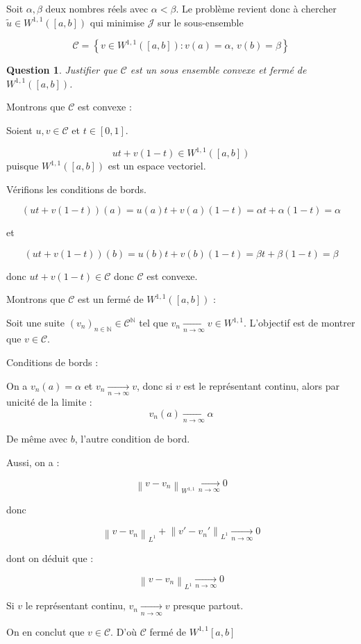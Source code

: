 \documentclass{article}
\newcommand{\Integer}{ \mathbb{N} }
\newcommand{\Set}[1]{ \left\{ #1 \right\} }
\newcommand{\Sobolev}[1]{ W^{1,1}\left( #1 \right) }
\newcommand{\Norm}[2]{ \left\| #1 \right\|_{#2} }
\newcommand{\TendsTo}[4]{#1 \xrightarrow[#2  \rightarrow #3]{} #4}
\newtheorem{question}{Question}[subsection]
\newenvironment{answer}
  {\color{blue}}
  {}
\newcommand{\QuestionAnswer}[2]{
    \begin{question}
        #1
    \end{question}
    \begin{answer}
        #2
    \end{answer}
}
\newcommand{\SetC}{\mathcal{C}}
\begin{document}
Soit $\alpha, \beta$ deux nombres réels avec $\alpha < \beta$. Le problème revient donc à chercher $\tilde{u} \in \Sobolev{[a, b]}$ qui minimise $ \mathcal{J} $ sur le sous-ensemble
    
$$\SetC = \Set{v \in \Sobolev{[a, b]} : v(a) = \alpha, \, v(b) = \beta }$$

\QuestionAnswer{
     Justifier que $\SetC$ est un sous ensemble convexe et fermé de  $\Sobolev{[a, b]}$.
}{
    Montrons que $\SetC$ est convexe :

    Soient $u, v \in \SetC$ et $t \in [0, 1]$.

    $$u t + v (1-t) \in \Sobolev{[a, b]}$$ puisque $\Sobolev{[a, b]}$ est un espace vectoriel.

    Vérifions les conditions de bords.

    $$(u t + v (1-t))(a) = u(a) t + v(a) (1-t) = \alpha t + \alpha (1-t) = \alpha$$

    et

    $$(u t + v (1-t))(b) = u(b) t + v(b) (1-t) = \beta t + \beta (1-t) = \beta$$

    donc $u t + v (1-t) \in \SetC$ donc $\SetC$ est convexe.
    \newline

    Montrons que $\SetC$ est un fermé de $\Sobolev{[a, b]}$ :

    Soit une suite $(v_n)_{n \in \Integer} \in \SetC^\Integer$ tel que $\TendsTo{v_n}{n}{\infty}{v \in W^{1,1}}$. L'objectif est de montrer que $v \in \SetC$.\newline

    Conditions de bords :\newline

    On a $v_n(a) = \alpha$ et $\TendsTo{v_n}{n}{\infty}{v}$, donc si $v$ est le représentant continu, alors par unicité de la limite :
    $$\TendsTo{v_n(a)}{n}{\infty}{\alpha}$$

    De même avec $b$, l'autre condition de bord.

    Aussi, on a :

    $$\TendsTo{ \Norm{v - v_n}{W^{1,1}} }{n}{\infty}{0}$$

    donc

    $$\TendsTo{ \Norm{v - v_n}{L^1} + \Norm{v' - v_n'}{L^1} }{n}{\infty}{0}$$

    dont on déduit que :

    $$\TendsTo{ \Norm{v - v_n}{L^1} }{n}{\infty}{0}$$

    Si $v$ le représentant continu, $\TendsTo{v_n}{n}{\infty}{v}$ presque partout.

    On en conclut que $v \in \SetC$. D'où $\SetC$ fermé de $W^{1,1}[a,b]$
}
\end{document}
